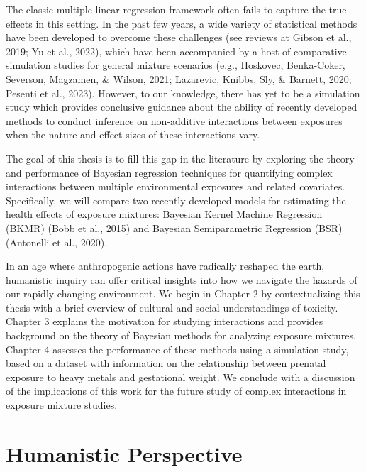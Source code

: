 \documentclass[12pt, twoside]{amherstthesis}
\begin{document}
The classic multiple linear regression framework often fails to capture the true effects in this setting. In the past few years, a wide variety of statistical methods have been developed to overcome these challenges (see reviews at Gibson et al., 2019; Yu et al., 2022), which have been accompanied by a host of comparative simulation studies for general mixture scenarios (e.g., Hoskovec, Benka-Coker, Severson, Magzamen, \& Wilson, 2021; Lazarevic, Knibbs, Sly, \& Barnett, 2020; Pesenti et al., 2023). However, to our knowledge, there has yet to be a simulation study which provides conclusive guidance about the ability of recently developed methods to conduct inference on non-additive interactions between exposures when the nature and effect sizes of these interactions vary.

The goal of this thesis is to fill this gap in the literature by exploring the theory and performance of Bayesian regression techniques for quantifying complex interactions between multiple environmental exposures and related covariates. Specifically, we will compare two recently developed models for estimating the health effects of exposure mixtures: Bayesian Kernel Machine Regression (BKMR) (Bobb et al., 2015) and Bayesian Semiparametric Regression (BSR) (Antonelli et al., 2020).

In an age where anthropogenic actions have radically reshaped the earth, humanistic inquiry can offer critical insights into how we navigate the hazards of our rapidly changing environment. We begin in Chapter 2 by contextualizing this thesis with a brief overview of cultural and social understandings of toxicity. Chapter 3 explains the motivation for studying interactions and provides background on the theory of Bayesian methods for analyzing exposure mixtures. Chapter 4 assesses the performance of these methods using a simulation study, based on a dataset with information on the relationship between prenatal exposure to heavy metals and gestational weight. We conclude with a discussion of the implications of this work for the future study of complex interactions in exposure mixture studies.

\hypertarget{humanistic}{%
\chapter{Humanistic Perspective}\label{humanistic}}
\end{document}
